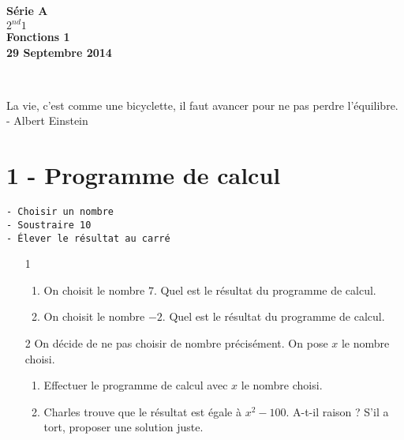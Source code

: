 \documentclass[11pt]{article}
\begin{document}

\begin{minipage}[t]{\textwidth}
  \raggedright
      {\bfseries Série A}\\[.35ex]
      {\bfseries $2^{nd}1$}\\[.35ex]
      \vspace*{-1cm}
      \raggedleft
          {\bfseries Fonctions 1}\\[.35ex]
          {\bfseries 29 Septembre 2014}\\[.35ex]
\end{minipage}\\[1em]

\begin{center}
  \textsf{La vie, c'est comme une bicyclette, il faut avancer pour ne pas perdre l'équilibre. - Albert Einstein}\\
\end{center}

\setlength{\columnseprule}{1pt}

\section*{1 - Programme de calcul}

\begin{verbatim}
- Choisir un nombre
- Soustraire 10
- Élever le résultat au carré
\end{verbatim}

\begin{enumerate}
\item[1]
  \begin{enumerate}
  \item On choisit le nombre $ 7$. Quel est le résultat du programme de calcul.
  \item On choisit le nombre $-2$. Quel est le résultat du programme de calcul.
  \end{enumerate}
\item[2] On décide de ne pas choisir de nombre précisément. On pose $x$ le nombre choisi.
  \begin{enumerate}
  \item Effectuer le programme de calcul avec $x$ le nombre choisi.
  \item Charles trouve que le résultat est égale à $x^2 - 100$. A-t-il raison ? S'il a tort, proposer une solution juste.
  \end{enumerate}
\end{enumerate}
\end{document}
